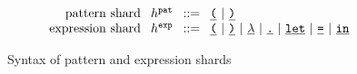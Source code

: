 \begin{figure}
  \[\arraycolsep=4pt\begin{array}{rlrl}
    \text{pattern shard} & \shard^{\pat} & ::= &
      \shardlit{\texttt{(}} ~\vert~
      \shardlit{\texttt{)}} \\
    \text{expression shard} & \shard^{\expr} & ::= &
      \shardlit{\texttt{(}} ~\vert~
      \shardlit{\texttt{)}} ~\vert~
      \shardlit{\lambda} ~\vert~
      \shardlit{\texttt{.}} ~\vert~
      \shardlit{\texttt{let}} ~\vert~
      \shardlit{\texttt{=}} ~\vert~
      \shardlit{\texttt{in}}
  \end{array}\]
  \caption{Syntax of pattern and expression shards}
  \label{fig:shard-syntax-2}
\end{figure}
